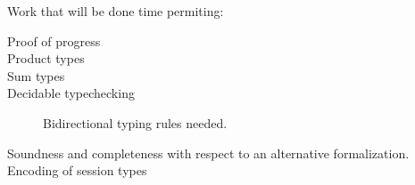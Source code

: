 \documentclass[a4paper,UKenglish,cleveref, autoref, thm-restate,authorcolumns]{lipics-v2019}
\theoremstyle{definition}
\begin{document}
Work that will be done time permiting:

\begin{description}

\item [Proof of progress]

\item [Product types]

\item [Sum types]

\item [Decidable typechecking]

  Bidirectional typing rules needed.

\item [Soundness and completeness with respect to an alternative formalization.]

\item [Encoding of session types]

\end{description}



\end{document}
